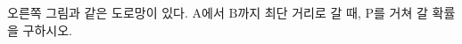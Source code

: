 \noindent\begin{minipage}[t]{0.58\linewidth}\vspace{0pt}\raggedright 오른쪽 그림과 같은 도로망이 있다. $\mathrm{A}$에서 $\mathrm{B}$까지 최단 거리로 갈 때, $\mathrm{P}$를 거쳐 갈 확률을 구하시오. \end{minipage}\hfill\begin{minipage}[t]{0.4\linewidth}\vspace{0pt}\centering \resizebox{\ifdim\width>\linewidth\linewidth\else\width\fi}{!}{}\end{minipage}\par
